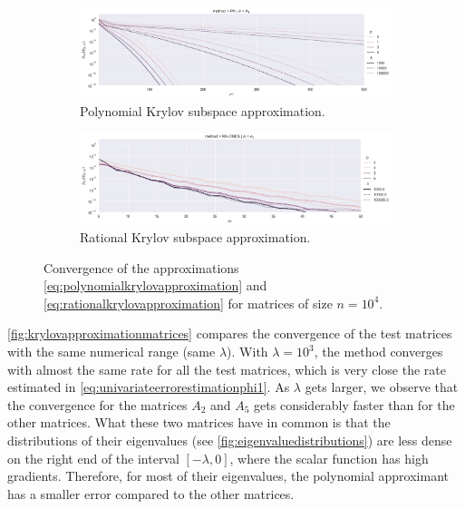 \begin{figure}[h]
    \centering
    \begin{subfigure}[b]{.9\textwidth}
        \includegraphics[width=\textwidth]{img/krylovapproximation/cnvg_ps_PA_n1e04.png}
        \caption{Polynomial Krylov subspace approximation.}
        \label{fig:polynomialkrylovapproximationevaluation}
    \end{subfigure}
    \vfill
    \begin{subfigure}[b]{.9\textwidth}
        \includegraphics[width=\textwidth]{img/krylovapproximation/cnvg_ps_RA-ONES_n1e04.png}
        \caption{Rational Krylov subspace approximation.}
        \label{fig:rationalkrylovapproximationevaluation}
    \end{subfigure}
    \caption{
        Convergence of the approximations \eqref{eq:polynomialkrylovapproximation}
        and \eqref{eq:rationalkrylovapproximation} for matrices of size $n=10^{4}$.
    }
    \label{fig:krylovapproximationevaluation}
\end{figure}

\autoref{fig:krylovapproximationmatrices} compares the convergence of the test matrices
with the same numerical range (same $\lambda$).
With $\lambda = 10^3$, the method converges with almost the same rate for all the test matrices,
which is very close the rate estimated in \eqref{eq:univariateerrorestimationphi1}.
As $\lambda$ gets larger, we observe that the convergence for the matrices $A_2$ and $A_5$
gets considerably faster than for the other matrices.
What these two matrices have in common is that the distributions of their eigenvalues
(see \autoref{fig:eigenvaluedistributions}) are less dense on the right end of the
interval $[-\lambda, 0]$, where the scalar function has high gradients.
Therefore, for most of their eigenvalues, the polynomial approximant has a smaller error
compared to the other matrices.


